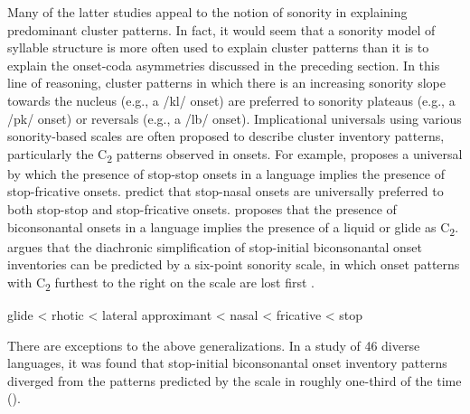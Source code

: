   Many of the latter studies appeal to the notion of sonority in explaining predominant cluster patterns. In fact, it would seem that a sonority model of syllable structure is more often used to explain cluster patterns than it is to explain the onset-coda asymmetries discussed in the preceding section. In this line of reasoning, cluster patterns in which there is an increasing sonority slope towards the nucleus (e.g., a /kl/ onset) are preferred to sonority plateaus (e.g., a /pk/ onset) or reversals (e.g., a /lb/ onset). Implicational universals using various sonority-based scales are often proposed to describe cluster inventory patterns, particularly the C\textsubscript{2} patterns observed in onsets. For example, \citet{Morelli1999} proposes a universal by which the presence of stop-stop onsets in a language implies the presence of stop-fricative onsets. \citet{LennertzBerent2015} predict that stop-nasal onsets are universally preferred to both stop-stop and stop-fricative onsets. \citet{Parker2012} proposes that the presence of biconsonantal onsets in a language implies the presence of a liquid or glide as C\textsubscript{2}. \citet{Vennemann2012} argues that the diachronic simplification of stop-initial biconsonantal onset inventories can be predicted by a six-point sonority scale, in which onset patterns with C\textsubscript{2} furthest to the right on the scale are lost first .

\ea\label{ex:(1.7)}
  glide < rhotic < lateral approximant < nasal < fricative < stop
\z

  There are exceptions to the above generalizations. In a study of 46 diverse languages, it was found that stop-initial biconsonantal onset inventory patterns diverged from the patterns predicted by the scale in  roughly one-third of the time (\citealt{EasterdayNapoleãodeSouza2015}). 

